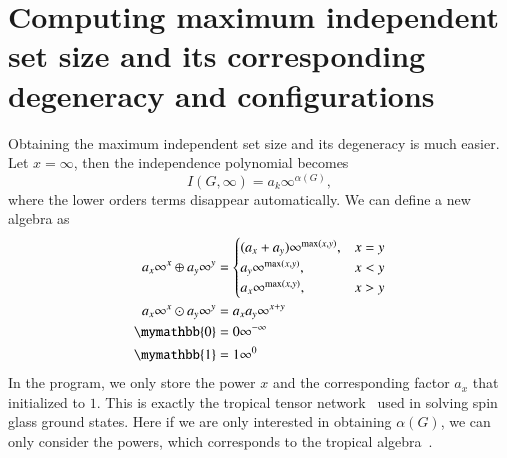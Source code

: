 \documentclass{article}
\newcommand{\<}{\langle}
\renewcommand{\>}{\rangle}
\renewcommand{\cite}[1]{{\citep{#1}}}
\theoremstyle{definition}\newtheorem{definition}{\textit{Definition}}
\begin{document}
\section{Computing maximum independent set size and its corresponding degeneracy and configurations}
Obtaining the maximum independent set size and its degeneracy is much easier. Let $x=\infty$, then the independence polynomial becomes
\begin{equation}
I(G, \infty) = a_k \infty^{\alpha(G)},
\end{equation}
where the lower orders terms disappear automatically. We can define a new algebra as
\begin{align}
\begin{split}
    a_x\infty^x \oplus a_y\infty^y &= \begin{cases}
        (a_x + a_y)\infty^{\max(x,y)}, & x = y\\
        a_y\infty^{\max(x,y)}, & x < y\\
        a_x\infty^{\max(x,y)}, & x > y
    \end{cases}\\
    a_x\infty^x \odot a_y\infty^y &= a_x a_y\infty^{x+y}\\
    \mymathbb{0} &= 0\infty^{-\infty}\\
    \mymathbb{1} &= 1\infty^{0}
\end{split}
\end{align}
In the program, we only store the power $x$ and the corresponding factor $a_x$ that initialized to $1$. This is exactly the tropical tensor network~\cite{Liu2021} used in solving spin glass ground states.
Here if we are only interested in obtaining $\alpha(G)$, we can only consider the powers, which corresponds to the tropical algebra~\cite{Maclagan2015}.
\end{document}
